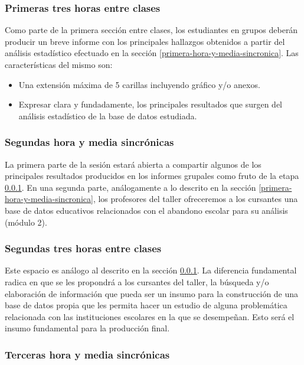 \subsubsection{Primeras tres horas entre clases}\label{primeras-tres-horas-entre-clases}

Como parte de la primera sección entre clases, los estudiantes en grupos deberán producir un breve informe con los principales hallazgos obtenidos a partir del análisis estadístico efectuado en la sección \ref{primera-hora-y-media-sincronica}. Las características del mismo son:
\begin{itemize}
	\item Una extensión máxima de 5 carillas incluyendo gráfico y/o anexos.
	\item Expresar clara y fundadamente, los principales resultados que surgen del análisis estadístico de la base de datos estudiada.
\end{itemize}

\subsubsection{Segundas hora y media sincrónicas}\label{segundas-hora-y-media-sincronicas}

La primera parte de la sesión estará abierta a compartir algunos de los principales resultados producidos en los informes grupales como fruto de la etapa \ref{primeras-tres-horas-entre-clases}. En una segunda parte, análogamente a lo descrito en la sección \ref{primera-hora-y-media-sincronica}, los profesores del taller ofreceremos a los cursantes una base de datos educativos relacionados con el abandono escolar para su análisis (módulo 2).

\subsubsection{Segundas tres horas entre clases}\label{segundas-tres-horas-entre-clases}

Este espacio es análogo al descrito en la sección \ref{primeras-tres-horas-entre-clases}. La diferencia fundamental radica en que se les propondrá a los cursantes del taller, la búsqueda y/o elaboración de información que pueda ser un insumo para la construcción de una base de datos propia que les permita hacer un estudio de alguna problemática relacionada con las instituciones escolares en la que se desempeñan. Esto será el insumo fundamental para la producción final.

\subsubsection{Terceras hora y media sincrónicas}

